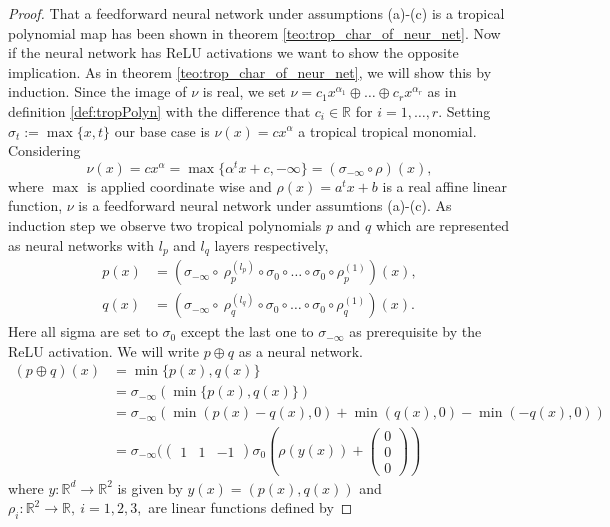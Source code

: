 \documentclass{article}
\theoremstyle{definition}
\begin{document}
\begin{proof}
That a feedforward neural network under assumptions (a)-(c) is a tropical polynomial map has been shown in theorem \ref{teo:trop_char_of_neur_net}. Now if the neural network has ReLU activations we want to show the opposite implication. As in theorem \ref{teo:trop_char_of_neur_net}, we will show this by induction. Since the image of $\nu$ is real, we set $\nu=c_1x^{\alpha_1} \oplus \dots \oplus c_rx^{\alpha_r}$ as in definition \ref{def:tropPolyn} with the difference that $c_i \in \mathbb{R}$ for $i = 1, \dots , r$. Setting $\sigma_{t} := \max \{ x, t\}$ our base case is $\nu (x) = c x^{\alpha}$ a tropical tropical monomial. Considering
$$\nu(x) = cx^{\alpha} = \max \{ \alpha^{t}x + c, -\infty \} = (\sigma_{- \infty} \circ \rho)(x),$$
where $\max$ is applied coordinate wise and $\rho(x) = a^{t}x + b$ is a real affine linear function, $\nu$ is a feedforward neural network under assumtions (a)-(c). As induction step we observe two tropical polynomials $p$ and $q$ which are represented as neural networks with $l_{p}$ and $l_{q}$ layers respectively,
\begin{align*}
p(x) &= (\sigma_{- \infty} \circ \ \rho_{p}^{(l_{p})} \circ \sigma_{0} \circ \dots \circ \sigma_{0} \circ \rho_{p}^{(1)})(x), \\
q(x) &= (\sigma_{- \infty} \circ \ \rho_{q}^{(l_{q})} \circ \sigma_{0} \circ \dots \circ \sigma_{0} \circ \rho_{q}^{(1)})(x).
\end{align*}
Here all sigma are set to $\sigma_{0}$ except the last one to $\sigma_{- \infty}$ as prerequisite by the ReLU activation. We will write $p \oplus q$ as a neural network.
\begin{align*}
(p \oplus q)(x) 
&= \min \{ p(x), q(x) \} \\
&= \sigma_{- \infty }( \min \{ p(x), q(x) \} ) \\
&= \sigma_{- \infty }( \min(p(x)-q(x), 0) + \min(q(x), 0) - \min(-q(x), 0)) \\
&= \sigma_{- \infty }(\begin{pmatrix} 1 & 1 & -1 \end{pmatrix} \sigma_{0}(\rho(y(x)) + \begin{pmatrix} 0 \\ 0 \\ 0 \end{pmatrix})
\end{align*}
where $y:\mathbb{R}^{d} \to \mathbb{R}^{2}$ is given by $y(x)=(p(x),q(x))$ and $\rho_{i}:\mathbb{R}^{2} \to \mathbb{R}, \ i=1,2, 3,$ are linear functions defined by

\end{proof}
\end{document}
